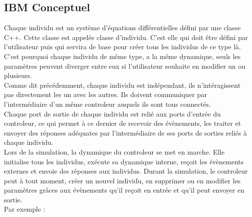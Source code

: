 \subsection{IBM Conceptuel}
Chaque individu est un système d'équations différentielles défini par une classe C++. Cette classe est appelée classe d'individu. C'est elle qui doit être défini par l'utilisateur puis qui servira de base pour créer tous les individus de ce type là. C'est pourquoi chaque individu de même type, a la même dynamique, seuls les paramètres peuvent diverger entre eux si l'utilisateur souhaite en modifier un ou plusieurs.\\
Comme dit précédemment, chaque individu est indépendant, ils n'intéragissent pas directement les un avec les autres. Ils doivent communiquer par l'intermédiaire d'un même controleur auquels ils sont tous connectés.\\
Chaque port de sortie de chaque individu est relié aux ports d'entrée du controleur, ce qui permet à ce dernier de recevoir des évènements, les traiter et envoyer des réponses adéquates par l'intermédiaire de ses ports de sorties reliés à chaque individu.\\
Lors de la simulation, la dynamique du controleur se met en marche. Elle initialise tous les individus, exécute sa dynamique interne, reçoit les évènements externes et envoie des réponses aux individus. Durant la simulation, le controleur peut à tout moment, créer un nouvel individu, en supprimer ou en modifier les paramètres grâces aux évènements qu'il reçoit en entrée et qu'il peut envoyer en sortie.\\
Par exemple :\\
\begin{minipage}{\linewidth}%
\end{minipage}

